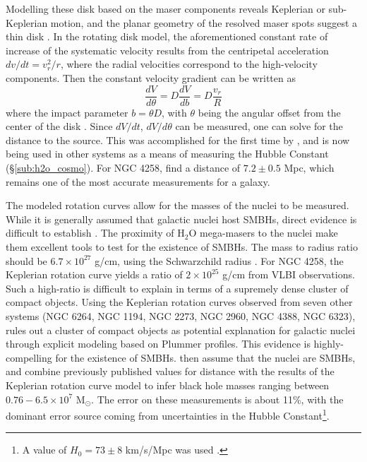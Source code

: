 Modelling these disk based on the maser components reveals Keplerian or sub-Keplerian motion, and the planar geometry of the resolved maser spots suggest a thin disk \citep{lo2005}. In the rotating disk model, the aforementioned constant rate of increase of the systematic velocity results from the centripetal acceleration $dv/dt = v_r^2/r$, where the radial velocities correspond to the high-velocity components. Then the constant velocity gradient can be written as
\begin{equation}
\label{eq:disk_rot}
\frac{dV}{d\theta} = D \frac{dV}{db} = D \frac{v_r}{R}
\end{equation}
where the impact parameter $b= \theta D$, with $\theta$ being the angular offset from the center of the disk \citep{lo2005}. Since $dV/dt$, $dV/d\theta$ can be measured, one can solve for the distance to the source. This was accomplished for the first time by \citet{Miyoshi_1994}, and is now being used in other systems as a means of measuring the Hubble Constant (\S\ref{sub:h2o_cosmo}). For NGC 4258, \citet{Herrnstein_1999} find a distance of $7.2\pm0.5$ Mpc, which remains one of the most accurate measurements for a galaxy.

The modeled rotation curves allow for the masses of the nuclei to be measured. While it is generally assumed that galactic nuclei host SMBHs, direct evidence is difficult to establish \citep{lo2005}. The proximity of H$_2$O mega-masers to the nuclei make them excellent tools to test for the existence of SMBHs. The mass to radius ratio should be $6.7\times10^{27}$ g/cm, using the Schwarzchild radius \citep{lo2005}. For NGC 4258, the Keplerian rotation curve yields a ratio of $2\times10^{25}$ g/cm from VLBI observations. Such a high-ratio is difficult to explain in terms of a supremely dense cluster of compact objects. Using the Keplerian rotation curves observed from seven other systems (NGC 6264, NGC 1194, NGC 2273, NGC 2960, NGC 4388, NGC 6323), \citet{kuo2011_mmproject_III} rules out a cluster of compact objects as potential explanation for galactic nuclei through explicit modeling based on Plummer profiles. This evidence is highly-compelling for the existence of SMBHs. \citet{kuo2011_mmproject_III} then assume that the nuclei are SMBHs, and combine previously published values for distance with the results of the Keplerian rotation curve model to infer black hole masses ranging between $0.76-6.5\times10^7$ M$_{\odot}$. The error on these measurements is about 11\%, with the dominant error source coming from uncertainties in the Hubble Constant\footnote{A value of $H_0=73\pm8$ km/s/Mpc was used \citep{Freedman_2001}.}.   

